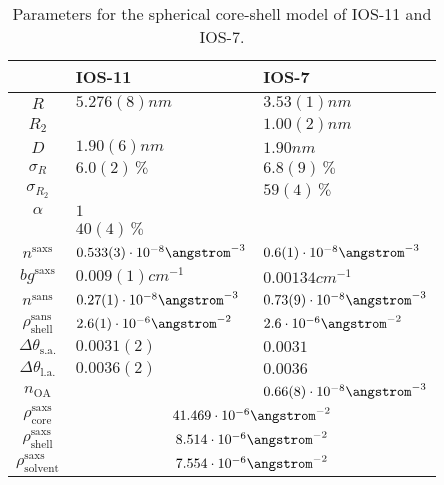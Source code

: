 \documentclass[\main/dresen_thesis.tex]{subfiles}
\begin{document}
    \begin{table}[tb]
      \centering
      \caption{\label{tab:looselyPackedNP:nanoparticle:sas}Parameters for the spherical core-shell model of IOS-11 and IOS-7.}
      \begin{tabular}{ c | l | l }
          & IOS-11 & IOS-7 \\
        \hline
        $R$
          & $5.276(8) \unit{nm}$
          & $3.53(1) \unit{nm}$\\
        $R_2$
          &
          & $1.00(2) \unit{nm}$\\
        $D$
          & $1.90(6) \unit{nm}$
          & $1.90 \unit{nm}$\\
        $\sigma_R$
          & $6.0(2) \,\%$
          & $6.8(9) \,\%$\\
        $\sigma_{R_2}$
          &
          & $59(4) \,\%$\\
        \hline
        $\alpha$
          & $1$\\
          & $40(4) \,\%$\\
        $n^\mathrm{saxs}$
          & $0.533(3) \cdot 10^{-8} \angstrom^{-3}$
          & $0.6(1) \cdot 10^{-8} \angstrom^{-3}$\\
        $bg^\mathrm{saxs}$
          & $0.009(1) \unit{cm}^{-1}$
          & $0.00134 \unit{cm}^{-1}$\\
        $n^\mathrm{sans}$
          & $0.27(1)\cdot 10^{-8} \angstrom^{-3}$
          & $0.73(9) \cdot 10^{-8} \angstrom^{-3}$\\
        $\rho_\mathrm{shell}^\mathrm{sans}$
          & $2.6(1) \cdot 10^{-6} \angstrom^{-2}$
          & $2.6    \cdot 10^{-6} \angstrom^{-2}$\\
        $\Delta \theta_\mathrm{s. a.}$
          & $0.0031(2)$
          & $0.0031$\\
        $\Delta \theta_\mathrm{l. a.}$
          & $0.0036(2)$
          & $0.0036$\\
        $n_\mathrm{OA}$
          &
          & $0.66(8) \cdot 10^{-8} \angstrom^{-3}$\\
        \hline
        $\rho_\mathrm{core}^\mathrm{saxs}$
          & \multicolumn{2}{c}{$41.469 \cdot 10^{-6} \angstrom^{-2}$}\\
        $\rho_\mathrm{shell}^\mathrm{saxs}$
          & \multicolumn{2}{c}{$8.514 \cdot 10^{-6} \angstrom^{-2}$}\\
        $\rho_\mathrm{solvent}^\mathrm{saxs}$
          & \multicolumn{2}{c}{$7.554 \cdot 10^{-6} \angstrom^{-2}$}\\

\end{tabular}
\end{table}
\end{document}
